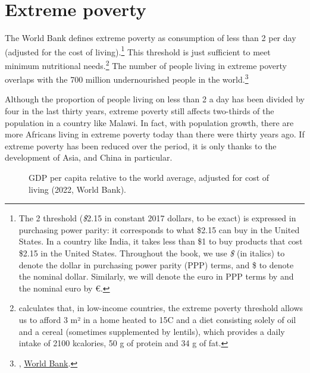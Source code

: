 \documentclass[a5paper,english,openany]{memoir}
\begin{document}
\section{Extreme poverty} %

The World Bank defines extreme poverty as consumption of less than \textit{\texteuro{}}2 per day (adjusted for the cost of living).\footnote{The \textit{\texteuro{}}2 threshold (\textit{\$}2.15 in constant 2017 dollars, to be exact) is expressed in purchasing power parity: it corresponds to what \$2.15 can buy in the United States. In a country like India, it takes less than \$1 to buy products that cost \$2.15 in the United States. Throughout the book, we use \textit{\$} (in italics) to denote the dollar in purchasing power parity (PPP) terms, and \$ to denote the nominal dollar. Similarly, we will denote the euro in PPP terms by \textit{\texteuro{}} and the nominal euro by \euro{}.} %
This threshold is just sufficient to meet minimum nutritional needs.\footnote{\citet{allen_absolute_2017} calculates that, in low-income countries, the extreme poverty threshold allows us to afford 3 m² in a home heated to 15\textdegree{}C and a diet consisting solely of oil and a cereal (sometimes supplemented by lentils), which provides a daily intake of 2100 kcalories, 50 g of protein and 34 g of fat.} 
The number of people living in extreme poverty overlaps with the 700 million undernourished people in the world.\footnote{\citet{fao_state_2023}, \href{https://data.worldbank.org/indicator/SI.POV.DDAY?end=2019&locations=MW-1W&start=1990&view=chart}{World Bank}.} 

Although the proportion of people living on less than \textit{\texteuro{}}2 a day has been divided by four in the last thirty years, extreme poverty still affects two-thirds of the population in a country like Malawi. In fact, with population growth, there are more Africans living in extreme poverty today than there were thirty years ago. If extreme poverty has been reduced over the period, it is only thanks to the development of Asia, and China in particular. %

\begin{figure}[h!] 
  \caption[Inequalities in GDP per capita]{GDP per capita relative to the world average, adjusted for cost of living (2022, World Bank). %
  }\label{fig:GDPpc}
\end{figure}
\end{document}

